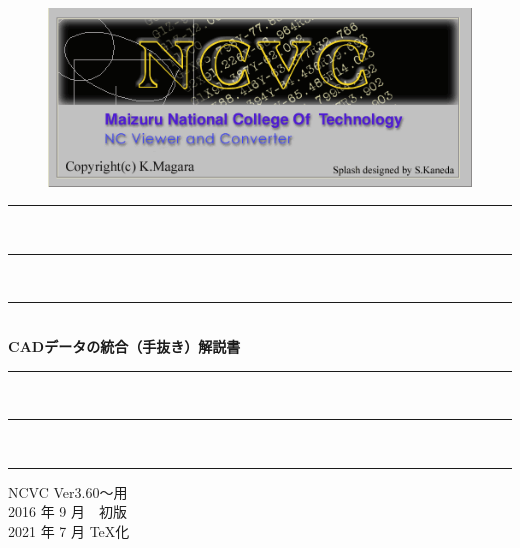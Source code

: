 
\vspace*{4zh}
\begin{figure}[H]
\centering
\includegraphics[scale=1.2]{logo.png}
\end{figure}

\vspace*{3zh}
\begin{center}
    \rule{10cm}{0.2zw}\\[-0.5zh]
    \rule{9cm}{0.1zw}\\[-0.5zh]
    \rule{8cm}{0.05zw}\\[1zh]
    {\Large \textbf{CADデータの統合}}\textbf{（手抜き）}{\Large \textbf{解説書}}\\
    \rule{8cm}{0.05zw}\\[-0.5zh]
    \rule{9cm}{0.1zw}\\[-0.5zh]
    \rule{10cm}{0.2zw}

    \vspace*{8cm}
    NCVC Ver3.60～用\\
    2016 年 9 月　初版\\
    2021 年 7 月 \TeX 化
\end{center}
